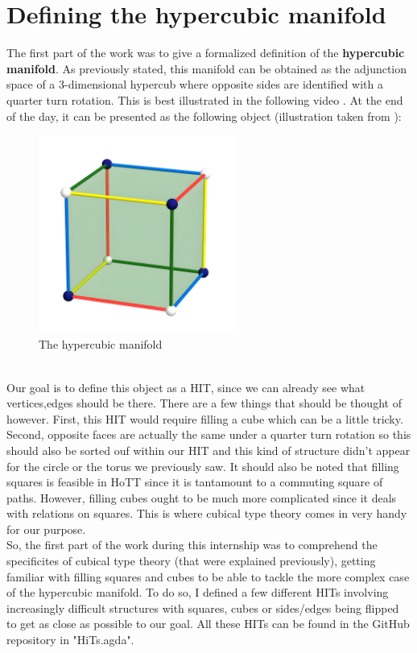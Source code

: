 \documentclass{report}
\begin{document}
\section{Defining the hypercubic manifold}
The first part of the work was to give a formalized definition of the \textbf{hypercubic manifold}. As previously stated, this manifold can be obtained as the adjunction space of a 3-dimensional hypercub where opposite sides are identified with a quarter turn rotation. This is best illustrated in the following video \cite{VHvideo}. At the end of the day, it can be presented as the following object (illustration taken from \cite{hypercubic}):
\begin{figure}[h]
  \begin{center}
    \includegraphics[height= 6.5cm]{cube-3-2.png}
    \caption{The hypercubic manifold}
    \label{fig:H1M}
  \end{center}
\end{figure}\\
Our goal is to define this object as a HIT, since we can already see what vertices,edges should be there. There are a few things that should be thought of however. First, this HIT would require filling a cube which can be a little tricky. Second, opposite faces are actually the same under a quarter turn rotation so this should also be sorted ouf within our HIT and this kind of structure didn't appear for the circle or the torus we previously saw. It should also be noted that filling squares is feasible in HoTT since it is tantamount to a commuting square of paths. However, filling cubes ought to be much more complicated since it deals with relations on squares. This is where cubical type theory comes in very handy for our purpose.\\
So, the first part of the work during this internship was to comprehend the specificites of cubical type theory (that were explained previously), getting familiar with filling squares and cubes to be able to tackle the more complex case of the hypercubic manifold. To do so, I defined a few different HITs involving increasingly difficult structures with squares, cubes or sides/edges being flipped to get as close as possible to our goal. All these HITs can be found in the GitHub repository \cite{repo} in "HiTs.agda". 
\newpage
\end{document}
